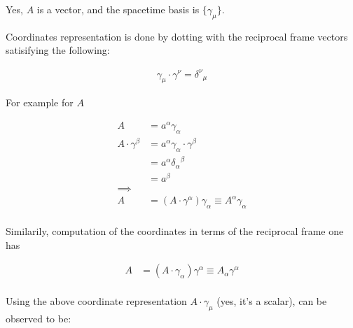 \documentclass{article}      %
\begin{document}




Yes, $A$ is a vector, and the spacetime basis is $\{\gamma_\mu\}$.

Coordinates representation is done by dotting with the reciprocal frame
vectors satisifying the following:

\begin{align*}
\gamma_\mu \cdot \gamma^\nu = {\delta^\nu}_\mu
\end{align*}

For example for $A$

\begin{align*}
A &= a^\alpha \gamma_\alpha \\
A \cdot \gamma^\beta
&= a^\alpha \gamma_\alpha \cdot \gamma^\beta \\
&= a^\alpha {\delta_\alpha}^\beta \\
&= a^\beta \\
\implies \\
A &= \left(A \cdot \gamma^\alpha\right) \gamma_\alpha \equiv A^\alpha \gamma_\alpha \\
\end{align*}

Similarily, computation of the coordinates in terms of the reciprocal frame
one has

\begin{align*}
A &= \left(A \cdot \gamma_\alpha\right) \gamma^\alpha \equiv A_\alpha \gamma^\alpha \\
\end{align*}

Using the above coordinate representation $A \cdot \gamma_\mu$ (yes, it's a scalar), can be observed to be:
\end{document}
